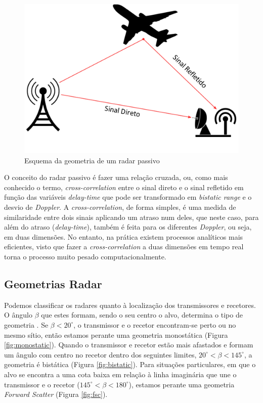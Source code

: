 \begin{figure}[h]
\centering
\includegraphics[scale=0.7]{chapters/ch2/assets/esquema_pcl}
\caption[Esquema Geometria Radar Passivo]{Esquema da geometria de um radar passivo}
\label{fig:esquema_pcl}
\end{figure}

O conceito do radar passivo é fazer uma relação cruzada, ou, como mais conhecido o termo, \textit{cross-correlation} entre o sinal direto e o sinal refletido em função das variáveis \textit{delay-time} que pode ser transformado em \textit{bistatic range} e o desvio de \textit{Doppler}. A \textit{cross-correlation}, de forma simples, é uma medida de similaridade entre dois sinais aplicando um atraso num deles, que neste caso, para além do atraso (\textit{delay-time}), também é feita para os diferentes \textit{Doppler}, ou seja, em duas dimensões. No entanto, na prática existem processos analíticos mais eficientes, visto que fazer a \textit{cross-correlation} a duas dimensões em tempo real torna o processo muito pesado computacionalmente.



\subsection{Geometrias Radar}
Podemos classificar os radares quanto à localização dos transmissores e recetores. O ângulo $\beta$ que estes formam, sendo o seu centro o alvo, determina o tipo de geometria \parencite{Baker2019}. Se $\beta <20^{\circ}$, o transmissor e o recetor encontram-se perto ou no mesmo sítio, então estamos perante uma geometria monostática (Figura \ref{fig:monostatic}). Quando o transmissor e recetor estão mais afastados e formam um ângulo com centro no recetor dentro dos seguintes limites, $20^{\circ}<\beta <145^{\circ}$, a geometria é bistática (Figura \ref{fig:bistatic}). Para situações particulares, em que o alvo se encontra a uma cota baixa em relação à linha imaginária que une o transmissor e o recetor ($145^{\circ}<\beta <180^{\circ}$), estamos perante uma geometria \textit{Forward Scatter} (Figura \ref{fig:fsc}).\par   

